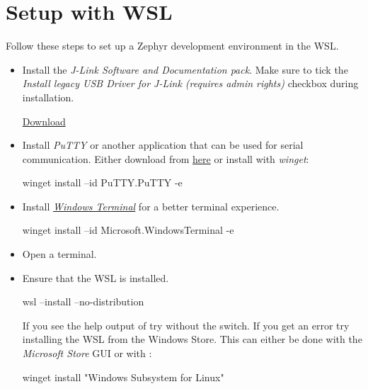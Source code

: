 \section{Setup with WSL}
\label{setupwithwsl}

Follow these steps to set up a Zephyr development environment in the WSL.

\begin{itemize}
  \item Install the \emph{J-Link Software and Documentation pack}.
    Make sure to tick the \emph{Install legacy USB Driver for J-Link (requires admin rights)} checkbox during installation.

    \href{https://www.segger.com/downloads/jlink/JLink_Windows_x86_64.exe}{Download}

  \item Install \emph{PuTTY} or another application that can be used for serial
    communication.
    Either download from \href{https://putty.org/}{here} or install with \emph{winget}:

        \begin{monobox}
winget install --id PuTTY.PuTTY -e
\end{monobox}

  \item Install \href{https://aka.ms/terminal}{\emph{Windows Terminal}} for a better terminal experience.

        \begin{monobox}
winget install --id Microsoft.WindowsTerminal -e
\end{monobox}

  \item Open a terminal.

  \item Ensure that the WSL is installed.
        \begin{monobox}
wsl --install --no-distribution
\end{monobox}

    \begin{infobox}
      If you see the help output of  try without the  switch.
      If you get an error try installing the WSL from the Windows Store.
      This can either be done with the \emph{Microsoft Store} GUI or with :

          \begin{monobox}
winget install "Windows Subsystem for Linux"
\end{monobox}
    \end{infobox}


\end{itemize}
